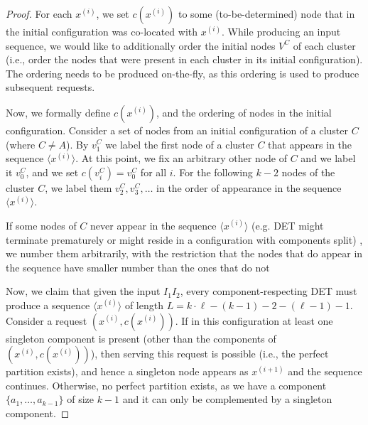 \begin{proof}
  For each $x^{(i)}$, we set $c(x^{(i)})$ to some (to-be-determined) node that in the initial configuration was co-located with $x^{(i)}$.
  While producing an input sequence, we would like to additionally order the initial nodes $V^C$ of each cluster (i.e., order the nodes that were present in each cluster in its initial configuration).
  The ordering needs to be produced on-the-fly, as this ordering is used to produce subsequent requests.
  
  
  Now, we formally define $c(x^{(i)})$, and the ordering of nodes in the initial configuration.
  Consider a set of nodes from an initial configuration of a cluster $C$ (where $C \neq A$).
  By $v^C_1$ we label the first node of a cluster $C$ that appears in the sequence $\langle x^{(i)}\rangle$.
  At this point, we fix an arbitrary other node of $C$ and we label it $v^C_0$, and we set $c(v^C_i) = v^C_0$ for all $i$.
  For the following $k-2$ nodes of the cluster $C$, we label them $v^C_2, v^C_3, \ldots$ in the order of appearance in the sequence $\langle x^{(i)}\rangle$.
  
  If some nodes of $C$ never appear in the sequence $\langle x^{(i)}\rangle$ (e.g. DET might terminate prematurely or might reside in a configuration with components split)
  , we number them arbitrarily, with the restriction that the nodes that do appear in the sequence have smaller number than the ones that do not 
  
  Now, we claim that given the input $I_1I_2$, every component-respecting DET 
  must produce a sequence $\langle x^{(i)}\rangle$ of length $L = k\cdot \ell - (k-1) - 2 - (\ell-1) - 1$.
  Consider a request $(x^{(i)}, c(x^{(i)}))$.
  If in this configuration at least one singleton component is present (other than the components of $(x^{(i)}, c(x^{(i)}))$), then serving this request is possible (i.e., the perfect partition exists), and hence a singleton node appears as $x^{(i+1)}$ and the sequence continues.
  Otherwise, no perfect partition exists, as we have a component $\{a_1, \ldots, a_{k-1}\}$ of size $k-1$ and it can only be complemented by a singleton component.


\end{proof}

